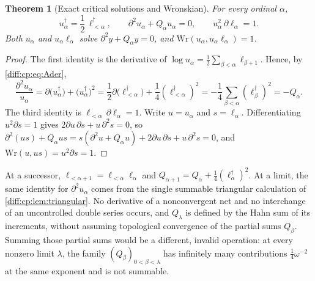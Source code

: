 \documentclass[11pt,letterpaper]{article}
\numberwithin{equation}{section}
\newtheorem{theorem}{Theorem}[section]
\theoremstyle{definition}
\theoremstyle{remark}
\newcommand{\der}{\partial}
\begin{document}
\begin{theorem}[Exact critical solutions and Wronskian]
\label{diff:cp:thm:critical}
For every ordinal $\alpha$,
\begin{equation}\label{diff:cp:eq:critical}
 u_{\alpha}^{\dagger}=\frac12\,\ell_{<\alpha}^{\dagger},
 \qquad
 \der^{2}u_{\alpha}+Q_{\alpha}u_{\alpha}=0,
 \qquad
 u_{\alpha}^{2}\,\der\ell_{\alpha}=1 .
\end{equation}
Both $u_{\alpha}$ and $u_{\alpha}\ell_{\alpha}$ solve $\der^{2}y+Q_{\alpha}y=0$,
and $\mathrm{Wr}(u_{\alpha},u_{\alpha}\ell_{\alpha})=1$.
\end{theorem}
\begin{proof}
The first identity is the derivative of
$\log u_{\alpha}=\frac12\sum_{\beta<\alpha}\ell_{\beta+1}$. Hence, by
\cref{diff:cp:eq:Ader},
\[
 \frac{\der^{2}u_{\alpha}}{u_{\alpha}}
 =\der\bigl(u_{\alpha}^{\dagger}\bigr)+\bigl(u_{\alpha}^{\dagger}\bigr)^{2}
 =\frac12\der\bigl(\ell_{<\alpha}^{\dagger}\bigr)+\frac14(\ell_{<\alpha}^{\dagger})^{2}
 =-\frac14\sum_{\beta<\alpha}(\ell_{\beta}^{\dagger})^{2}=-Q_{\alpha}.
\]
The third identity is $\ell_{<\alpha}\,\der\ell_{\alpha}=1$. Write $u=u_{\alpha}$
and $s=\ell_{\alpha}$. Differentiating $u^{2}\der s=1$ gives
$2\der u\,\der s+u\,\der^{2}s=0$, so
$\der^{2}(us)+Q_{\alpha}us=s(\der^{2}u+Q_{\alpha}u)+2\der u\,\der s+u\,\der^{2}s=0$,
and $\mathrm{Wr}(u,us)=u^{2}\der s=1$.
\end{proof}

\begin{remark}
\label{diff:cp:rem:limitstage}
At a successor, $\ell_{<\alpha+1}=\ell_{<\alpha}\ell_{\alpha}$ and
$Q_{\alpha+1}=Q_{\alpha}+\frac14(\ell_{\alpha}^{\dagger})^{2}$. At a limit, the
same identity for $\der^{2}u_{\alpha}$ comes from the single summable
triangular calculation of \cref{diff:cp:lem:triangular}. No derivative of a
nonconvergent net and no interchange of an uncontrolled double series occurs,
and $Q_{\lambda}$ is defined by the Hahn sum of its increments,
without assuming topological convergence of the partial sums
$Q_{\beta}$. Summing those partial sums would be a different,
invalid operation: at every nonzero limit $\lambda$, the family
$(Q_{\beta})_{0<\beta<\lambda}$ has infinitely many contributions
$\frac14\omega^{-2}$ at the same exponent and is not summable.
\end{remark}
\end{document}
